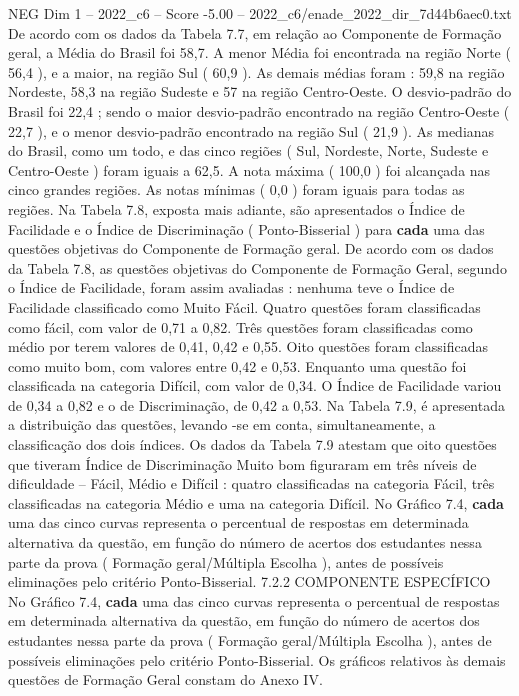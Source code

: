 \begin{textsample}{NEG Dim 1 – 2022\_c6 – Score -5.00 – 2022\_c6/enade\_2022\_dir\_7d44b6aec0.txt}
De acordo com os dados da Tabela 7.7, em relação ao Componente de Formação geral, a Média do Brasil foi 58,7.
A menor Média foi encontrada na região Norte ( 56,4 ), e a maior, na região Sul ( 60,9 ).
As demais médias foram : 59,8 na região Nordeste, 58,3 na região Sudeste e 57 na região Centro-Oeste.
O desvio-padrão do Brasil foi 22,4 ; sendo o maior desvio-padrão encontrado na região Centro-Oeste ( 22,7 ), e o menor desvio-padrão encontrado na região Sul ( 21,9 ).
As medianas do Brasil, como um todo, e das cinco regiões ( Sul, Nordeste, Norte, Sudeste e Centro-Oeste ) foram iguais a 62,5.
A nota máxima ( 100,0 ) foi alcançada nas cinco grandes regiões.
As notas mínimas ( 0,0 ) foram iguais para todas as regiões.
Na Tabela 7.8, exposta mais adiante, são apresentados o Índice de Facilidade e o Índice de Discriminação ( Ponto-Bisserial ) para \textbf{cada} uma das questões objetivas do Componente de Formação geral.
De acordo com os dados da Tabela 7.8, as questões objetivas do Componente de Formação Geral, segundo o Índice de Facilidade, foram assim avaliadas : nenhuma teve o Índice de Facilidade classificado como Muito Fácil.
Quatro questões foram classificadas como fácil, com valor de 0,71 a 0,82.
Três questões foram classificadas como médio por terem valores de 0,41, 0,42 e 0,55.
Oito questões foram classificadas como muito bom, com valores entre 0,42 e 0,53.
Enquanto uma questão foi classificada na categoria Difícil, com valor de 0,34.
O Índice de Facilidade variou de 0,34 a 0,82 e o de Discriminação, de 0,42 a 0,53.
Na Tabela 7.9, é apresentada a distribuição das questões, levando -se em conta, simultaneamente, a classificação dos dois índices.
Os dados da Tabela 7.9 atestam que oito questões que tiveram Índice de Discriminação Muito bom figuraram em três níveis de dificuldade – Fácil, Médio e Difícil : quatro classificadas na categoria Fácil, três classificadas na categoria Médio e uma na categoria Difícil.
No Gráfico 7.4, \textbf{cada} uma das cinco curvas representa o percentual de respostas em determinada alternativa da questão, em função do número de acertos dos estudantes nessa parte da prova ( Formação geral/Múltipla Escolha ), antes de possíveis eliminações pelo critério Ponto-Bisserial. 7.2.2 COMPONENTE ESPECÍFICO No Gráfico 7.4, \textbf{cada} uma das cinco curvas representa o percentual de respostas em determinada alternativa da questão, em função do número de acertos dos estudantes nessa parte da prova ( Formação geral/Múltipla Escolha ), antes de possíveis eliminações pelo critério Ponto-Bisserial.
Os gráficos relativos às demais questões de Formação Geral constam do Anexo IV.

\end{textsample}
